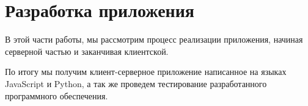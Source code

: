 \section{Разработка приложения}

В этой части работы, мы рассмотрим процесс реализации приложения, начиная серверной частью и заканчивая клиентской.

По итогу мы получим клиент-серверное приложение написанное на языках JavaScript и Python, а так же проведем тестирование разработанного программного обеспечения.
